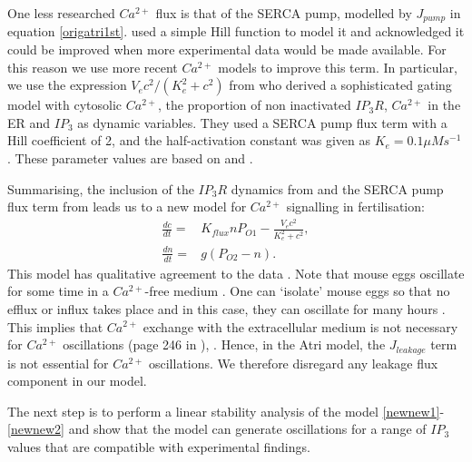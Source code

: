 One less researched $Ca^{2+}$ flux is that of the SERCA pump, modelled by $J_{pump}$ in equation \eqref{origatri1st}.  used a simple Hill function to model it and acknowledged it could be improved when more experimental data would be made available. For this reason we use more recent $Ca^{2+}$ models to improve this term. In particular, we use the expression {$V_ec^2/(K_e^2+c^2)$} from  who derived a sophisticated gating model with cytosolic $Ca^{2+}$, the proportion of non inactivated $IP_3R$, $Ca^{2+}$ in the ER and $IP_3$ as dynamic variables. They used a SERCA pump flux term with a Hill coefficient of 2, and the half-activation constant was given as $K_e=0.1 \mu Ms^{-1}$. These parameter values are based on  and .

Summarising, the inclusion of the $IP_3R$ dynamics from  and the SERCA pump flux term from  leads us to a new model for $Ca^{2+}$ signalling in fertilisation:
\begin{align}
    \frac{dc}{dt}=&K_{flux}nP_{O1}-\frac{V_ec^2}{K_e^2+c^2},\label{newnew1}\\
    \frac{dn}{dt}=&g(P_{O2}-n).\label{newnew2}
\end{align}
{This model has qualitative agreement to the data .} Note that mouse eggs oscillate for some time in a $Ca^{2+}$-free medium \cite{Sanders2018}. One can `isolate' mouse eggs so that no efflux or influx takes place and in this case, they can oscillate for many hours \cite{wakai}. This implies that $Ca^{2+}$ exchange with the extracellular medium is not necessary for $Ca^{2+}$ oscillations (page 246 in ), \cite{YaoParker1994}. Hence, in the Atri model, the $J_{leakage}$ term is not essential for $Ca^{2+}$ oscillations. We therefore disregard any leakage flux component in our model.

The next step is to perform a linear stability analysis of the model \eqref{newnew1}-\eqref{newnew2} and show that the model can generate oscillations for a range of $IP_3$ values that are compatible with experimental findings.


